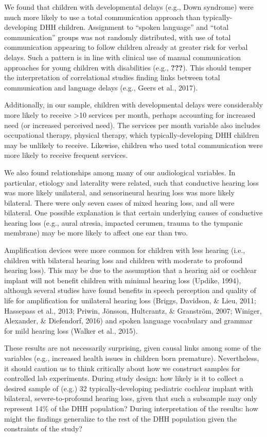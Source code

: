 \documentclass[english,man]{apa6}
\begin{document}
We found that children with developmental delays (e.g., Down syndrome) were much more likely to use a total communication approach than typically-developing DHH children. Assignment to \enquote{spoken language} and \enquote{total communication} groups was not randomly distributed, with use of total communication appearing to follow children already at greater risk for verbal delays. Such a pattern is in line with clinical use of manual communication approaches for young children with disabilities (e.g., {\textbf{???}}). This should temper the interpretation of correlational studies finding links between total communication and language delays (e.g., Geers et al., 2017).

Additionally, in our sample, children with developmental delays were considerably more likely to receive \textgreater{}10 services per month, perhaps accounting for increased need (or increased perceived need). The services per month variable also includes occupational therapy, physical therapy, which typically-developing DHH children may be unlikely to receive. Likewise, children who used total communication were more likely to receive frequent services.

We also found relationships among many of our audiological variables. In particular, etiology and laterality were related, such that conductive hearing loss was more likely unilateral, and sensorineural hearing loss was more likely bilateral. There were only seven cases of mixed hearing loss, and all were bilateral. One possible explanation is that certain underlying causes of conductive hearing loss (e.g., aural atresia, impacted cerumen, trauma to the tympanic membrane) may be more likely to affect one ear than two.

Amplification devices were more common for children with less hearing (i.e., children with bilateral hearing loss and children with moderate to profound hearing loss). This may be due to the assumption that a hearing aid or cochlear implant will not benefit children with minimal hearing loss (Updike, 1994), although several studies have found benefits in speech perception and quality of life for amplification for unilateral hearing loss (Briggs, Davidson, \& Lieu, 2011; Hassepass et al., 2013; Priwin, Jönsson, Hultcrantz, \& Granström, 2007; Winiger, Alexander, \& Diefendorf, 2016) and spoken language vocabulary and grammar for mild hearing loss (Walker et al., 2015).

These results are not necessarily surprising, given causal links among some of the variables (e.g., increased health issues in children born premature). Nevertheless, it should caution us to think critically about how we construct samples for controlled lab experiments. During study design: how likely is it to collect a desired sample of (e.g.) 32 typically-developing pediatric cochlear implant with bilateral, severe-to-profound hearing loss, given that such a subsample may only represent 14\% of the DHH population? During interpretation of the results: how might the findings generalize to the rest of the DHH population given the constraints of the study?
\end{document}
